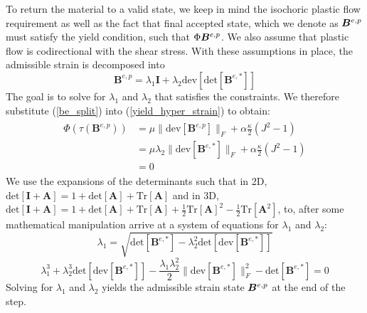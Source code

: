 To return the material to a valid state, we keep in mind the isochoric plastic flow requirement as well as the fact that final accepted state, which we denote as $\b_p$ must satisfy the yield condition, such that $\Phi{\b_p}$. We also assume that plastic flow is codirectional with the shear stress. With these assumptions in place, the admissible strain is decomposed into
\begin{equation}
\bm{B}^{e,p}=\lambda_1\bm{I}+\lambda_2 \text{dev}[\text{det}[\bm{B}^{e,*}]] \label{be_split}
\end{equation}
The goal is to solve for $\lambda_1$ and $\lambda_2$ that satisfies the constraints. We therefore substitute (\ref{be_split}) into (\ref{yield_hyper_strain}) to obtain:
\begin{align}
\begin{aligned}
  \Phi\left( \tau \left( \bm{B}^{e,p} \right) \right) &= \mu \| \text{dev}[\bm{B}^{e,p}] \|_F + \alpha \frac{\kappa}{2} ( J^2 - 1 ) \\
                                                             &= \mu \lambda_2 \| \text{dev}[\bm{B}^{e,*}] \|_F + \alpha \frac{\kappa}{2} ( J^2 - 1 ) \\
&= 0
\end{aligned}
\end{align}
We use the expansions of the determinants such that in 2D, $\text{det}[\bm{I} + \bm{A}] = 1 + \text{det}[\bm{A}] + \text{Tr}[\bm{A}]$ and in 3D, $\text{det}[\bm{I} + \bm{A}] = 1 + \text{det}[\bm{A}] + \text{Tr}[\bm{A}] + \frac{1}{2}\text{Tr}[\bm{A}]^2 - \frac{1}{2}\text{Tr}[\bm{A}^2]$, to, after some mathematical manipulation arrive at a system of equations for $\lambda_1$ and $\lambda_2$:
\begin{equation}
\lambda_1 = \sqrt{\text{det}[\bm{B}^{e,*}] - \lambda_2^2 \text{det}[ \text{dev}[\bm{B}^{e,*}]]}
\end{equation}
\begin{equation}
\lambda^3_1 + \lambda^3_2 \text{det}[\text{dev}[\bm{B}^{e,*}]] - \frac{\lambda_1 \lambda^2_2}{2} \|\text{dev}[\bm{B}^{e,*}]\|^2_F - 
\text{det}[\bm{B}^{e,*}] = 0
\end{equation}
Solving for $\lambda_1$ and $\lambda_2$ yields the admissible strain state $\b_p$ at the end of the step.

